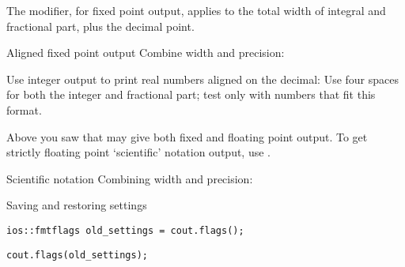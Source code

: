 The  modifier, for fixed point output,
applies to the total width of integral and fractional part,
plus the decimal point.

\begin{block}{Aligned fixed point output}
  \label{sl:io-align}
  Combine width and precision:
\end{block}

\begin{exercise}
  \label{ex:fixedpout}
  Use integer output to print real numbers aligned on the
  decimal:
  Use four spaces for both the integer and fractional part; test only
  with numbers that fit this format.
\end{exercise}

Above you saw that  may give both fixed and floating point
output. To get strictly floating point `scientific' notation output,
use .

\begin{block}{Scientific notation}
  \label{sl:io-sci}
  Combining width and precision:
  
\end{block}

\begin{comment}
\begin{verbatim}
cout << "Combine width and precision:" << "\n";
x = 1.234567;
cout << scientific;
for (int i=0; i<10; i++) {
  cout << setw(10) << setprecision(4) << x << "\n";
  x *= 10;
}
\end{verbatim}
\begin{block}{Output}
  \label{sl:io-sci-out}
\begin{verbatim}
Combine width and precision:
1.2346e+00
1.2346e+01
1.2346e+02
1.2346e+03
1.2346e+04
1.2346e+05
1.2346e+06
1.2346e+07
1.2346e+08
1.2346e+09
\end{verbatim}
\end{block}
\end{comment}

 {Saving and restoring settings}

\begin{verbatim}
ios::fmtflags old_settings = cout.flags();
\end{verbatim}

\begin{verbatim}
cout.flags(old_settings);
\end{verbatim}

